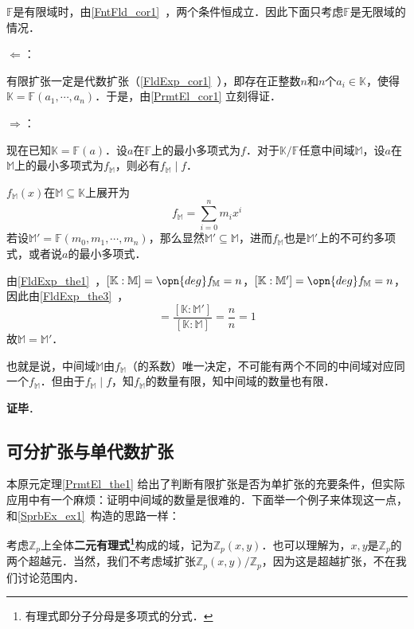 $\mathbb{F}$是有限域时，由\autoref{FntFld_cor1}~，两个条件恒成立．因此下面只考虑$\mathbb{F}$是无限域的情况．

$\Leftarrow$：

有限扩张一定是代数扩张（\autoref{FldExp_cor1}~），即存在正整数$n$和$n$个$a_i\in\mathbb{K}$，使得$\mathbb{K}=\mathbb{F}(a_1, \cdots, a_n)$．于是，由\autoref{PrmtEl_cor1} 立刻得证．

$\Rightarrow$：

现在已知$\mathbb{K}=\mathbb{F}(a)$．设$a$在$\mathbb{F}$上的最小多项式为$f$．对于$\mathbb{K}/\mathbb{F}$任意中间域$\mathbb{M}$，设$a$在$\mathbb{M}$上的最小多项式为$f_\mathbb{M}$，则必有$f_{\mathbb{M}}\mid f$．

$f_\mathbb{M}(x)$在$\mathbb{M}\subseteq\mathbb{K}$上展开为
\begin{equation}
f_\mathbb{M} = \sum_{i=0}^n m_ix^i
\end{equation}
若设$\mathbb{M}'=\mathbb{F}(m_0, m_1, \cdots, m_n)$，那么显然$\mathbb{M}'\subseteq\mathbb{M}$，进而$f_\mathbb{M}$也是$\mathbb{M}'$上的不可约多项式，或者说$a$的最小多项式．

由\autoref{FldExp_the1}~，$[\mathbb{K}:\mathbb{M}]=\opn{deg}f_\mathbb{M}=n$，$[\mathbb{K}:\mathbb{M}']=\opn{deg}f_\mathbb{M}=n$，因此由\autoref{FldExp_the3}~，
\begin{equation}
[\mathbb{M}:\mathbb{M}']=\frac{[\mathbb{K}:\mathbb{M}']}{[\mathbb{K}:\mathbb{M}]}=\frac{n}{n}=1
\end{equation}
故$\mathbb{M}=\mathbb{M}'$．

也就是说，中间域$\mathbb{M}$由$f_\mathbb{M}$（的系数）唯一决定，不可能有两个不同的中间域对应同一个$f_{\mathbb{M}}$．但由于$f_\mathbb{M}\mid f$，知$f_\mathbb{M}$的数量有限，知中间域的数量也有限．

\textbf{证毕}．


\subsection{可分扩张与单代数扩张}



本原元定理\autoref{PrmtEl_the1} 给出了判断有限扩张是否为单扩张的充要条件，但实际应用中有一个麻烦：证明中间域的数量是很难的．下面举一个例子来体现这一点，和\autoref{SprbEx_ex1}~构造的思路一样：


考虑$\mathbb{Z}_p$上全体\textbf{二元有理式\footnote{有理式即分子分母是多项式的分式．}}构成的域，记为$\mathbb{Z}_p(x, y)$．也可以理解为，$x, y$是$\mathbb{Z}_p$的两个超越元．当然，我们不考虑域扩张$\mathbb{Z}_p(x, y)/\mathbb{Z}_p$，因为这是超越扩张，不在我们讨论范围内．

